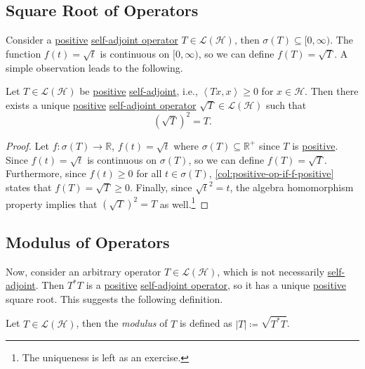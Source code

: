 \subsection{Square Root of Operators}
Consider a \hyperref[def:positive-op]{positive} \hyperref[def:self-adjoint-op]{self-adjoint operator} \(T\in \mathcal{L} (\mathcal{H} )\), then \(\sigma (T) \subseteq [0, \infty )\). The function \(f(t) = \sqrt{t} \) is continuous on \([0, \infty )\), so we can define \(f(T) = \sqrt{T} \). A simple observation leads to the following.

\begin{proposition}\label{prop:square-root-of-op}
	Let \(T\in \mathcal{L} (\mathcal{H} )\) be \hyperref[def:positive-op]{positive} \hyperref[def:self-adjoint-op]{self-adjoint}, i.e., \(\left\langle Tx, x \right\rangle \geq 0\) for \(x\in \mathcal{H} \). Then there exists a unique \hyperref[def:positive-op]{positive} \hyperref[def:self-adjoint-op]{self-adjoint operator} \(\sqrt{T} \in \mathcal{L} (\mathcal{H} )\) such that
	\[
		(\sqrt{T} )^{2} = T.
	\]
\end{proposition}
\begin{proof}
	Let \(f\colon \sigma(T) \to \mathbb{R} \), \(f(t) = \sqrt{t} \) where \(\sigma (T) \subseteq \mathbb{R} ^+\) since \(T\) is \hyperref[def:positive-op]{positive}. Since \(f(t) = \sqrt{t} \) is continuous on \(\sigma (T)\), so we can define \(f(T) = \sqrt{T} \). Furthermore, since \(f(t) \geq 0\) for all \(t\in \sigma (T)\), \autoref{col:positive-op-if-f-positive} states that \(f(T) = \sqrt{T}\geq 0\). Finally, since \(\sqrt{t} ^2 = t\), the algebra homomorphism property implies that \((\sqrt{T} )^2 = T\) as well.\footnote{The uniqueness is left as an exercise.}
\end{proof}

\subsection{Modulus of Operators}
Now, consider an arbitrary operator \(T\in \mathcal{L} (\mathcal{H} )\), which is not necessarily \hyperref[def:self-adjoint-op]{self-adjoint}. Then \(T^{\ast} T\) is a \hyperref[def:positive-op]{positive} \hyperref[def:self-adjoint-op]{self-adjoint operator}, so it has a unique \hyperref[def:positive-op]{positive} square root. This suggests the following definition.

\begin{definition}[Modulus]\label{def:modulus}
	Let \(T\in \mathcal{L} (\mathcal{H} )\), then the \emph{modulus} of \(T\) is defined as \(\vert T \vert \coloneqq \sqrt{T^{\ast} T} \).
\end{definition}

